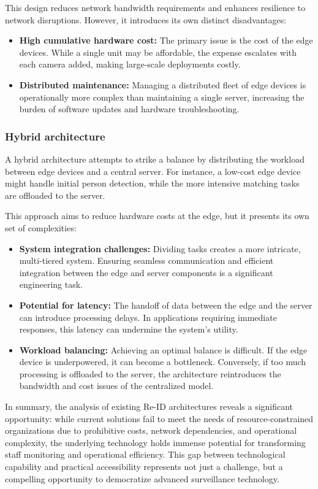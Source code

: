 \documentclass[../main.tex]{subfiles}
\begin{document}
This design reduces network bandwidth requirements and enhances resilience to network disruptions. However, it introduces its own distinct disadvantages:
\begin{itemize}
    \item \textbf{High cumulative hardware cost:} The primary issue is the cost of the edge devices. While a single unit may be affordable, the expense escalates with each camera added, making large-scale deployments costly.
    \item \textbf{Distributed maintenance:} Managing a distributed fleet of edge devices is operationally more complex than maintaining a single server, increasing the burden of software updates and hardware troubleshooting.
\end{itemize}

\subsubsection{Hybrid architecture}
A hybrid architecture attempts to strike a balance by distributing the workload between edge devices and a central server. For instance, a low-cost edge device might handle initial person detection, while the more intensive matching tasks are offloaded to the server.

This approach aims to reduce hardware costs at the edge, but it presents its own set of complexities:
\begin{itemize}
    \item \textbf{System integration challenges:} Dividing tasks creates a more intricate, multi-tiered system. Ensuring seamless communication and efficient integration between the edge and server components is a significant engineering task.
    \item \textbf{Potential for latency:} The handoff of data between the edge and the server can introduce processing delays. In applications requiring immediate responses, this latency can undermine the system's utility.
    \item \textbf{Workload balancing:} Achieving an optimal balance is difficult. If the edge device is underpowered, it can become a bottleneck. Conversely, if too much processing is offloaded to the server, the architecture reintroduces the bandwidth and cost issues of the centralized model.
\end{itemize}

In summary, the analysis of existing Re-ID architectures reveals a significant opportunity: while current solutions fail to meet the needs of resource-constrained organizations due to prohibitive costs, network dependencies, and operational complexity, the underlying technology holds immense potential for transforming staff monitoring and operational efficiency. This gap between technological capability and practical accessibility represents not just a challenge, but a compelling opportunity to democratize advanced surveillance technology.
\end{document}
